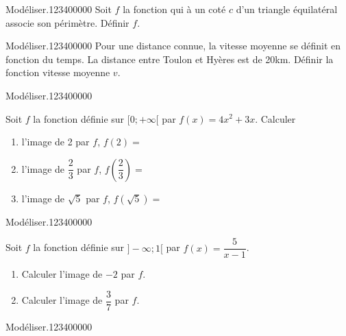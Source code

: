 \begin{pageAD} 
 


\begin{ExoCad}{Modéliser.}{1234}{0}{0}{0}{0}{0}
Soit $f$ la fonction qui à un coté $c$ d'un triangle équilatéral associe son périmètre. Définir $f$. 
\end{ExoCad} 


\begin{ExoCad}{Modéliser.}{1234}{0}{0}{0}{0}{0}
Pour une distance connue, la vitesse moyenne se définit en fonction du temps. La distance entre Toulon et Hyères est de 20km. Définir la fonction vitesse moyenne $v$. 
\end{ExoCad} 


\begin{ExoCad}{Modéliser.}{1234}{0}{0}{0}{0}{0}

Soit $f$ la fonction définie sur $[0;+\infty[$ par $f(x)= 4x^2+3x$. Calculer

\begin{enumerate}
\item l'image de 2 par $f$, $f(2)=$
\item l'image de $\dfrac{2}{3}$ par $f$, $f\left(\dfrac{2}{3}\right)=$
\item l'image de $\sqrt{5}$ par $f$, $f\left(\sqrt{5}\right)=$
\end{enumerate}
\end{ExoCad} 

 

\begin{ExoCad}{Modéliser.}{1234}{0}{0}{0}{0}{0}

Soit $f$ la fonction définie sur $]-\infty;1[$ par $f(x)= \dfrac{5}{x-1}$. 

\begin{enumerate}
\item Calculer l'image de $-2$ par $f$.  

\item Calculer l'image de $\dfrac{3}{7}$ par $f$. 

\end{enumerate}
\end{ExoCad}


 

\begin{ExoCad}{Modéliser.}{1234}{0}{0}{0}{0}{0}


\end{ExoCad}
\end{pageAD}
